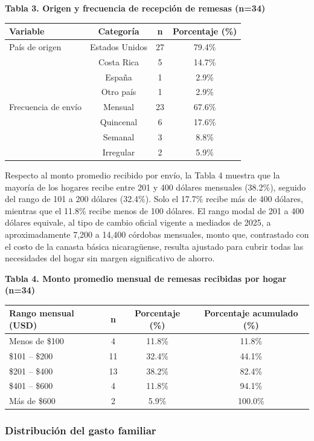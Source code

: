 \documentclass[12pt,letterpaper]{article}
\begin{document}
\textbf{Tabla 3. Origen y frecuencia de recepción de remesas (n=34)}

\begin{longtable}[]{@{}lccc@{}}
\toprule\noalign{}
Variable & Categoría & n & Porcentaje (\%) \\
\midrule\noalign{}
\endhead
\bottomrule\noalign{}
\endlastfoot
País de origen & Estados Unidos & 27 & 79.4\% \\
& Costa Rica & 5 & 14.7\% \\
& España & 1 & 2.9\% \\
& Otro país & 1 & 2.9\% \\
Frecuencia de envío & Mensual & 23 & 67.6\% \\
& Quincenal & 6 & 17.6\% \\
& Semanal & 3 & 8.8\% \\
& Irregular & 2 & 5.9\% \\
\end{longtable}

Respecto al monto promedio recibido por envío, la Tabla 4 muestra que la mayoría de los hogares recibe entre 201 y 400 dólares mensuales (38.2\%), seguido del rango de 101 a 200 dólares (32.4\%). Solo el 17.7\% recibe más de 400 dólares, mientras que el 11.8\% recibe menos de 100 dólares. El rango modal de 201 a 400 dólares equivale, al tipo de cambio oficial vigente a mediados de 2025, a aproximadamente 7,200 a 14,400 córdobas mensuales, monto que, contrastado con el costo de la canasta básica nicaragüense, resulta ajustado para cubrir todas las necesidades del hogar sin margen significativo de ahorro.

\textbf{Tabla 4. Monto promedio mensual de remesas recibidas por hogar (n=34)}

\begin{longtable}[]{@{}lccc@{}}
\toprule\noalign{}
Rango mensual (USD) & n & Porcentaje (\%) & Porcentaje acumulado (\%) \\
\midrule\noalign{}
\endhead
\bottomrule\noalign{}
\endlastfoot
Menos de \$100 & 4 & 11.8\% & 11.8\% \\
\$101 -- \$200 & 11 & 32.4\% & 44.1\% \\
\$201 -- \$400 & 13 & 38.2\% & 82.4\% \\
\$401 -- \$600 & 4 & 11.8\% & 94.1\% \\
Más de \$600 & 2 & 5.9\% & 100.0\% \\
\end{longtable}

\subsubsection{\texorpdfstring{\textbf{Distribución del gasto familiar}}{Distribución del gasto familiar}}\label{distribuciuxf3n-del-gasto-familiar}
\end{document}
